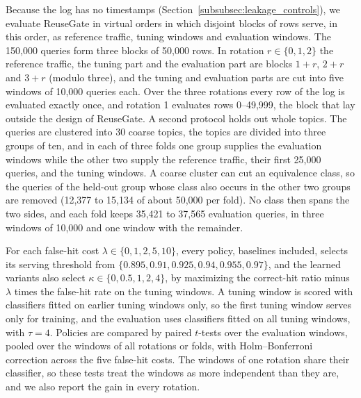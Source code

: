 \documentclass[authoryear,preprint,review,12pt]{elsarticle}
\begin{document}
Because the log has no timestamps (Section~\ref{subsubsec:leakage_controls}), we evaluate ReuseGate in virtual orders in which disjoint blocks of rows serve, in this order, as reference traffic, tuning windows and evaluation windows. The 150,000 queries form three blocks of 50,000 rows. In rotation $r\in\{0,1,2\}$ the reference traffic, the tuning part and the evaluation part are blocks $1+r$, $2+r$ and $3+r$ (modulo three), and the tuning and evaluation parts are cut into five windows of 10,000 queries each. Over the three rotations every row of the log is evaluated exactly once, and rotation 1 evaluates rows 0--49,999, the block that lay outside the design of ReuseGate. A second protocol holds out whole topics. The queries are clustered into 30 coarse topics, the topics are divided into three groups of ten, and in each of three folds one group supplies the evaluation windows while the other two supply the reference traffic, their first 25,000 queries, and the tuning windows. A coarse cluster can cut an equivalence class, so the queries of the held-out group whose class also occurs in the other two groups are removed (12,377 to 15,134 of about 50,000 per fold). No class then spans the two sides, and each fold keeps 35,421 to 37,565 evaluation queries, in three windows of 10,000 and one window with the remainder.

For each false-hit cost $\lambda\in\{0,1,2,5,10\}$, every policy, baselines included, selects its serving threshold from $\{0.895,0.91,0.925,0.94,0.955,0.97\}$, and the learned variants also select $\kappa\in\{0,0.5,1,2,4\}$, by maximizing the correct-hit ratio minus $\lambda$ times the false-hit rate on the tuning windows. A tuning window is scored with classifiers fitted on earlier tuning windows only, so the first tuning window serves only for training, and the evaluation uses classifiers fitted on all tuning windows, with $\tau=4$. Policies are compared by paired $t$-tests over the evaluation windows, pooled over the windows of all rotations or folds, with Holm--Bonferroni correction across the five false-hit costs. The windows of one rotation share their classifier, so these tests treat the windows as more independent than they are, and we also report the gain in every rotation.
\end{document}
